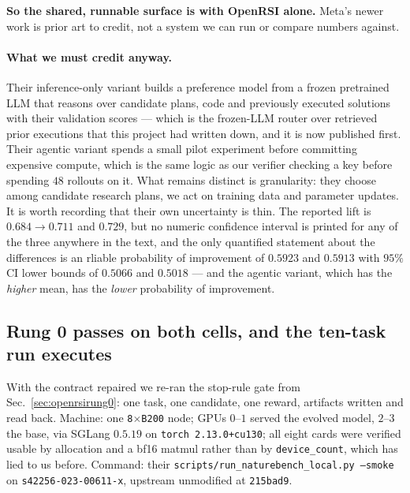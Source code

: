 \textbf{So the shared, runnable surface is with OpenRSI alone.} Meta's newer work is prior art
to credit, not a system we can run or compare numbers against.

\paragraph{What we must credit anyway.}
Their inference-only variant builds a preference model from a frozen pretrained LLM that
reasons over candidate plans, code and previously executed solutions with their validation
scores --- which is the frozen-LLM router over retrieved prior executions that this project
had written down, and it is now published first. Their agentic variant spends a small pilot
experiment before committing expensive compute, which is the same logic as our verifier
checking a key before spending $48$ rollouts on it. What remains distinct is granularity:
they choose among candidate research plans, we act on training data and parameter updates.
It is worth recording that their own uncertainty is thin. The reported lift is $0.684 \to
0.711$ and $0.729$, but no numeric confidence interval is printed for any of the three
anywhere in the text, and the only quantified statement about the differences is an rliable
probability of improvement of $0.5923$ and $0.5913$ with $95\%$ CI lower bounds of $0.5066$
and $0.5018$ --- and the agentic variant, which has the \emph{higher} mean, has the
\emph{lower} probability of improvement.

\subsection{Rung 0 passes on both cells, and the ten-task run executes}
\label{sec:openrsirung0c}

With the contract repaired we re-ran the stop-rule gate from Sec.~\ref{sec:openrsirung0}:
one task, one candidate, one reward, artifacts written and read back. Machine: one
\texttt{8$\times$B200} node; GPUs $0$--$1$ served the evolved model, $2$--$3$ the base, via
SGLang $0.5.19$ on \texttt{torch 2.13.0+cu130}; all eight cards were verified usable by
allocation and a bf16 matmul rather than by \texttt{device\_count}, which has lied to us
before. Command: their \texttt{scripts/run\_naturebench\_local.py --smoke} on
\texttt{s42256-023-00611-x}, upstream unmodified at \texttt{215bad9}.


